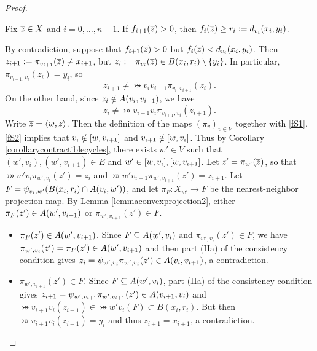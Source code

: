 \begin{proof}
\begin{claim}
\label{claimfS}
Fix $\overline z\in X$ and $i = 0,\ldots,n - 1$. If $f_{i + 1}(\overline z) > 0$, then $f_i(\overline z) \geq r_i := d_{v_i}(x_i,y_i)$.
\end{claim}
\begin{subproof}
By contradiction, suppose that $f_{i + 1}(\overline z) > 0$ but $f_i(\overline z) < d_{v_i}(x_i,y_i)$. Then $z_{i + 1} := \pi_{v_{i + 1}}(\overline z) \neq x_{i + 1}$, but $z_i := \pi_{v_i}(\overline z) \in B(x_i,r_i)\setminus\{y_i\}$. In particular, $\pi_{v_{i + 1},v_i}(z_i) = y_i$, so
\begin{equation}
\label{fS1}
z_{i + 1} \neq \bij{v_i}{v_{i + 1}}\pi_{v_i,v_{i + 1}}(z_i).
\end{equation}
On the other hand, since $z_i \notin A(v_i,v_{i + 1})$, we have 
\begin{equation}
\label{fS2}
z_i \neq \bij{v_{i + 1}}{v_i}\pi_{v_{i + 1},v_i}(z_{i + 1}).
\end{equation}
Write $\overline z = \langle w,z\rangle$. Then the definition of the maps $(\pi_v)_{v\in V}$ together with \eqref{fS1}, \eqref{fS2} implies that $v_i\notin[w,v_{i + 1}]$ and $v_{i + 1}\notin[w,v_i]$. Thus by Corollary \ref{corollarycontractiblecycles}, there exists $w'\in V$ such that $(w',v_i),(w',v_{i + 1})\in E$ and $w'\in[w,v_i],[w,v_{i + 1}]$. Let $z' = \pi_{w'}(\overline z)$, so that $\bij{w'}{v_i}\pi_{w',v_i}(z') = z_i$ and $\bij{w'}{v_{i + 1}}\pi_{w',v_{i + 1}}(z') = z_{i + 1}$. Let $F = \psi_{v_i,w'}(B(x_i,r_i)\cap A(v_i,w'))$, and let $\pi_F:X_{w'}\to F$ be the nearest-neighbor projection map. By Lemma \ref{lemmaconvexprojection2}, either $\pi_F(z')\in A(w',v_{i + 1})$ or $\pi_{w',v_{i + 1}}(z')\in F$.
\begin{itemize}
\item[Case 1:] $\pi_F(z')\in A(w',v_{i + 1})$. Since $F\subseteq A(w',v_i)$ and $\pi_{w',v_i}(z')\in F$, we have $\pi_{w',v_i}(z') = \pi_F(z')\in A(w',v_{i + 1})$ and then part (IIa) of the consistency condition gives $z_i = \psi_{w',v_i}\pi_{w',v_i}(z') \in A(v_i,v_{i + 1})$, a contradiction.
\item[Case 2:] $\pi_{w',v_{i + 1}}(z')\in F$. Since $F\subseteq A(w',v_i)$, part (IIa) of the consistency condition gives $z_{i + 1} = \psi_{w',v_{i + 1}}\pi_{w',v_{i + 1}}(z') \in A(v_{i + 1},v_i)$ and $\bij{v_{i + 1}}{v_i}(z_{i + 1})\in \bij{w'}{v_i}(F) \subset B(x_i,r_i)$. But then $\bij{v_{i + 1}}{v_i}(z_{i + 1}) = y_i$ and thus $z_{i + 1} = x_{i + 1}$, a contradiction.
\end{itemize}
\end{subproof}


\end{proof}
